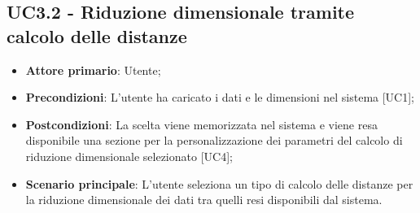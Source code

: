 \subsection{UC3.2 - Riduzione dimensionale tramite calcolo delle distanze}
\begin{itemize}
	\item \textbf{Attore primario}: Utente;
	\item \textbf{Precondizioni}: L'utente ha caricato i dati e le dimensioni nel sistema [UC1];
	\item \textbf{Postcondizioni}: La scelta viene memorizzata nel sistema e viene resa disponibile una sezione per la personalizzazione dei parametri del calcolo di riduzione dimensionale selezionato [UC4];
	\item \textbf{Scenario principale}: L'utente seleziona un tipo di calcolo delle distanze per la riduzione dimensionale dei dati tra quelli resi disponibili dal sistema.
\end{itemize}